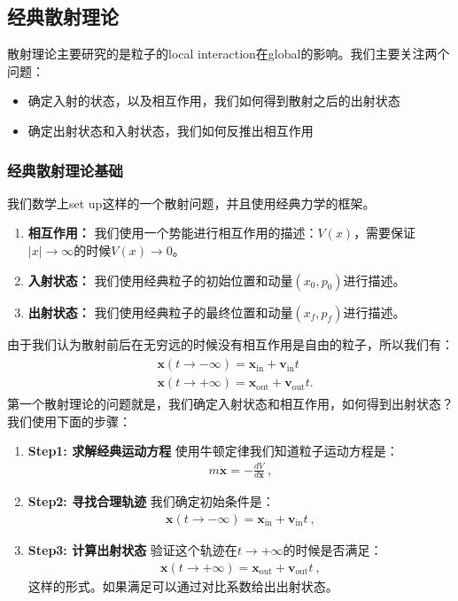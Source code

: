 \subsection{经典散射理论}
散射理论主要研究的是粒子的local interaction在global的影响。我们主要关注两个问题：
\begin{itemize}
  \item 确定入射的状态，以及相互作用，我们如何得到散射之后的出射状态
  \item 确定出射状态和入射状态，我们如何反推出相互作用
\end{itemize}

\subsubsection{经典散射理论基础}


我们数学上set up这样的一个散射问题，并且使用经典力学的框架。
\begin{enumerate}
  \item \textbf{相互作用：} 我们使用一个势能进行相互作用的描述：$ V(x) $，需要保证$ |x| \to
    \infty $的时候$ V(x) \to 0 $。
  \item \textbf{入射状态：} 我们使用经典粒子的初始位置和动量$ (x_0,p_0) $进行描述。
  \item \textbf{出射状态：} 我们使用经典粒子的最终位置和动量$ (x_f,p_f) $进行描述。
\end{enumerate}
由于我们认为散射前后在无穷远的时候没有相互作用是自由的粒子，所以我们有：
\begin{align}
  \begin{aligned}&\mathbf{x}(t\to-\infty)=\mathbf{x}_{\mathrm{in}}+\mathbf{v}_{\mathrm{in}}t\\&\mathbf{x}(t\to+\infty)=\mathbf{x}_{\mathrm{out}}+\mathbf{v}_{\mathrm{out}}t.
  \end{aligned}
\end{align}
第一个散射理论的问题就是，我们确定入射状态和相互作用，如何得到出射状态？我们使用下面的步骤：
\begin{enumerate}
  \item \textbf{Step1: 求解经典运动方程} 使用牛顿定律我们知道粒子运动方程是：
    \begin{align}
      m\ddot{\mathbf{x}}=-\frac{dV}{d\mathbf{x}}\mathrm{~,}
    \end{align}
  \item \textbf{Step2: 寻找合理轨迹} 我们确定初始条件是：
    \begin{align}
      \mathbf{x}(t\to-\infty)=\mathbf{x}_{\mathrm{in}}+\mathbf{v}_{\mathrm{in}}t\mathrm{~,}
    \end{align}
  \item \textbf{Step3: 计算出射状态} 验证这个轨迹在$ t \to +\infty $的时候是否满足：
    \begin{align}
      \mathbf{x}(t\to+\infty)=\mathbf{x}_{\mathrm{out}}+\mathbf{v}_{\mathrm{out}}t\mathrm{~,}
    \end{align}
    这样的形式。如果满足可以通过对比系数给出出射状态。

\end{enumerate}

